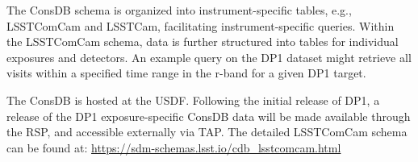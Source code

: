 The ConsDB schema is organized into instrument-specific tables, e.g., \gls{LSSTComCam} and LSSTCam, facilitating instrument-specific queries.
Within the \gls{LSSTComCam} schema, data is further structured into tables for individual exposures and detectors.
An example query on the \gls{DP1} dataset might retrieve all visits within a specified time range in the r-band for a given \gls{DP1} target.

The ConsDB is hosted at the \gls{USDF}.
Following the initial release of DP1, a release of the DP1 exposure-specific ConsDB data will be made available through the \gls{RSP}, and accessible externally via TAP.
The detailed \gls{LSSTComCam} schema can be found at:
\url{https://sdm-schemas.lsst.io/cdb_lsstcomcam.html}
